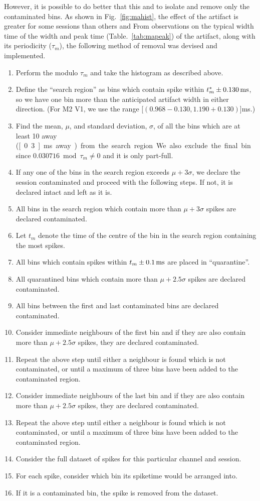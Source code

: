 However, it is possible to do better that this and to isolate and remove only the contaminated bins. As shown in Fig.~\ref{fig:mahist}, the effect of the artifact is greater for some sessions than others and
From observations on the typical width time of the width and peak time (Table.~\ref{tab:mapeak}) of the artifact, along with its periodicity ($\tau_m$), the following method of removal was devised and implemented.
\begin{enumerate}
\item Perform the modulo $\tau_m$ and take the histogram as described above.
\item Define the ``search region'' as bins which contain spike within $t^*_m \pm \unit[0.130]{ms}$, so we have one bin more than the anticipated artifact width in either direction. (For \ac{M2} \ac{V1}, we use the range \unit[$(0.968 - 0.130 , 1.190 + 0.130)$]{ms}.)
\item Find the mean, $\mu$, and standard deviation, $\sigma$, of all the bins which are at least 10 away (\unit[0.3]{ms} away) from the search region. We also exclude the final bin since $0.030716 \bmod \tau_m \neq 0$ and it is only part-full.
\item If any one of the bins in the search region exceeds $\mu + 3 \sigma$, we declare the session contaminated and proceed with the following steps. If not, it is declared intact and left as it is.
\item All bins in the search region which contain more than $\mu + 3 \sigma$ spikes are declared contaminated.
\item Let $t_m$ denote the time of the centre of the bin in the search region containing the most spikes.
\item All bins which contain spikes within $t_m \pm \unit[0.1]{ms}$ are placed in ``quarantine''.
\item All quarantined bins which contain more than $\mu + 2.5 \sigma$ spikes are declared contaminated.
\item All bins between the first and last contaminated bins are declared contaminated.
\item Consider immediate neighbours of the first bin and if they are also contain more than $\mu + 2.5 \sigma$ spikes, they are declared contaminated.
\item Repeat the above step until either a neighbour is found which is not contaminated, or until a maximum of three bins have been added to the contaminated region.
\item Consider immediate neighbours of the last bin and if they are also contain more than $\mu + 2.5 \sigma$ spikes, they are declared contaminated.
\item Repeat the above step until either a neighbour is found which is not contaminated, or until a maximum of three bins have been added to the contaminated region.
\item Consider the full dataset of spikes for this particular channel and session.
\item For each spike, consider which bin its spiketime would be arranged into.
\item If it is a contaminated bin, the spike is removed from the dataset.
\end{enumerate}

